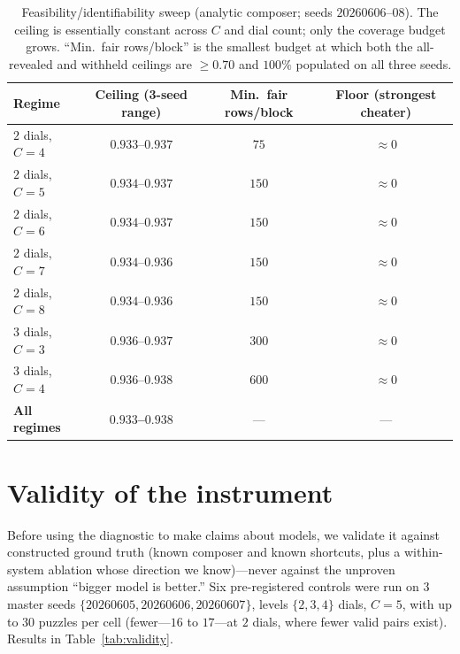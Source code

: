\documentclass[11pt]{article}
\begin{document}
\begin{table}[t]
\centering
\small
\begin{tabular}{lccc}
\toprule
Regime & Ceiling (3-seed range) & Min.\ fair rows/block & Floor (strongest cheater)\\
\midrule
$2$ dials, $C{=}4$ & $0.933$--$0.937$ & $75$  & $\approx 0$\\
$2$ dials, $C{=}5$ & $0.934$--$0.937$ & $150$ & $\approx 0$\\
$2$ dials, $C{=}6$ & $0.934$--$0.937$ & $150$ & $\approx 0$\\
$2$ dials, $C{=}7$ & $0.934$--$0.936$ & $150$ & $\approx 0$\\
$2$ dials, $C{=}8$ & $0.934$--$0.936$ & $150$ & $\approx 0$\\
$3$ dials, $C{=}3$ & $0.936$--$0.937$ & $300$ & $\approx 0$\\
$3$ dials, $C{=}4$ & $0.936$--$0.938$ & $600$ & $\approx 0$\\
\midrule
\textbf{All regimes} & \textbf{$0.933$--$0.938$} & --- & ---\\
\bottomrule
\end{tabular}
\caption{Feasibility/identifiability sweep (analytic composer; seeds $20260606$--$08$). The ceiling is
essentially constant across $C$ and dial count; only the coverage budget grows. ``Min.\ fair rows/block''
is the smallest budget at which both the all-revealed and withheld ceilings are $\geq 0.70$ and $100\%$
populated on all three seeds.}
\label{tab:ceiling}
\end{table}

\section{Validity of the instrument}\label{sec:validity}
Before using the diagnostic to make claims about models, we validate it against constructed ground truth
(known composer and known shortcuts, plus a within-system ablation whose direction we know)---never against
the unproven assumption ``bigger model is better.'' Six pre-registered controls were run on
$3$ master seeds $\{20260605,20260606,20260607\}$, levels $\{2,3,4\}$ dials, $C{=}5$, with up to $30$ puzzles
per cell (fewer---$16$ to $17$---at $2$ dials, where fewer valid pairs exist). Results in
Table~\ref{tab:validity}.
\end{document}
